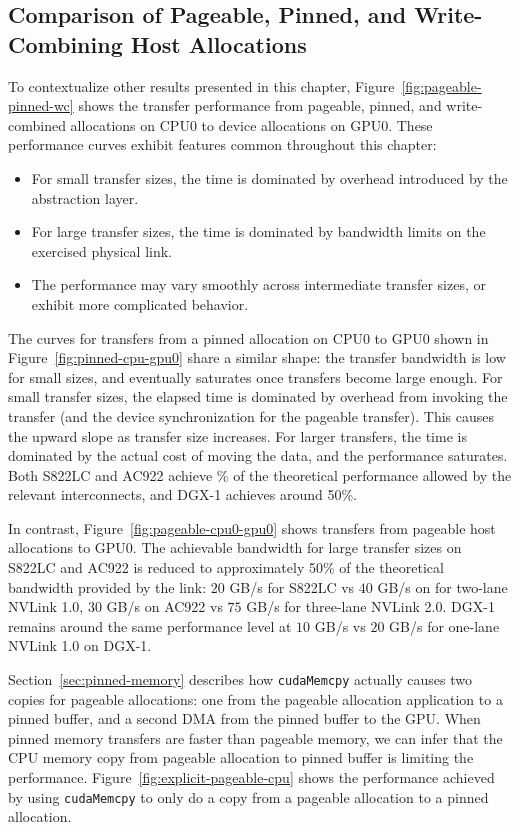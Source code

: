 \subsection{Comparison of Pageable, Pinned, and Write-Combining Host Allocations}
\label{sec:explicit-pageable-pinned-wc}

To contextualize other results presented in this chapter, Figure~\ref{fig:pageable-pinned-wc} shows the transfer performance from pageable, pinned, and write-combined allocations on CPU0 to device allocations on GPU0.
These performance curves exhibit features common throughout this chapter:
\begin{itemize}
\item For small transfer sizes, the time is dominated by overhead introduced by the abstraction layer.
\item For large transfer sizes, the time is dominated by bandwidth limits on the exercised physical link.
\item The performance may vary smoothly across intermediate transfer sizes, or exhibit more complicated behavior.
\end{itemize}

The curves for transfers from a pinned allocation on CPU0 to GPU0 shown in Figure~\ref{fig:pinned-cpu-gpu0} share a similar shape: the transfer bandwidth is low for small sizes, and eventually saturates once transfers become large enough.
For small transfer sizes, the elapsed time is dominated by overhead from invoking the transfer (and the device synchronization for the pageable transfer).
This causes the upward slope as transfer size increases.
For larger transfers, the time is dominated by the actual cost of moving the data, and the performance saturates.
Both S822LC and AC922 achieve \% of the theoretical performance allowed by the relevant interconnects, and DGX-1 achieves around 50\%.


In contrast, Figure~\ref{fig:pageable-cpu0-gpu0} shows transfers from pageable host allocations to GPU0.
The achievable bandwidth for large transfer sizes on S822LC and AC922 is reduced to approximately 50\% of the theoretical bandwidth provided by the link: $20$ GB/s for S822LC vs $40$ GB/s on for two-lane NVLink 1.0, $30$ GB/s on AC922 vs $75$ GB/s for three-lane NVLink 2.0.
DGX-1 remains around the same performance level at $10$ GB/s vs $20$ GB/s for one-lane NVLink 1.0 on DGX-1.

Section~\ref{sec:pinned-memory} describes how \texttt{cudaMemcpy} actually causes two copies for pageable allocations: one from the pageable allocation application to a pinned buffer, and a second DMA from the pinned buffer to the GPU.
When pinned memory transfers are faster than pageable memory, we can infer that the CPU memory copy from pageable allocation to pinned buffer is limiting the performance.
Figure~\ref{fig:explicit-pageable-cpu} shows the performance achieved by using \texttt{cudaMemcpy} to only do a copy from a pageable allocation to a pinned allocation.

